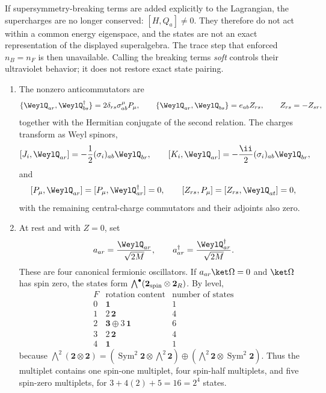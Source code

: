 \begin{enumerate}
\begin{enumerate}
      If supersymmetry-breaking terms are added explicitly to the
      Lagrangian, the supercharges are no longer conserved:
      \([H,Q_a]\ne0\).  They therefore do not act within a common
      energy eigenspace, and the states are not an exact representation
      of the displayed superalgebra.  The trace step that enforced
      \(n_B=n_F\) is then unavailable.  Calling the breaking terms
      \emph{soft} controls their ultraviolet behavior; it does not
      restore exact state pairing.
  \end{enumerate}

  \begin{enumerate}
    \item The nonzero anticommutators are
      \[
        \{\WeylQ_{ar},\WeylQ_{bs}^\dagger\}
          =2\delta_{rs}\sigma^\mu_{ab}P_\mu,
        \qquad
        \{\WeylQ_{ar},\WeylQ_{bs}\}=e_{ab}Z_{rs},
        \qquad Z_{rs}=-Z_{sr},
      \]
      together with the Hermitian conjugate of the second relation.  The
      charges transform as Weyl spinors,
      \[
        [J_i,\WeylQ_{ar}]
          =-\frac12(\sigma_i)_{ab}\WeylQ_{br},
        \qquad
        [K_i,\WeylQ_{ar}]
          =-\frac{\ii}{2}(\sigma_i)_{ab}\WeylQ_{br},
      \]
      and
      \[
        [P_\mu,\WeylQ_{ar}]=[P_\mu,\WeylQ_{ar}^\dagger]=0,
        \qquad [Z_{rs},P_\mu]=[Z_{rs},\WeylQ_{at}]=0,
      \]
      with the remaining central-charge commutators and their adjoints also
      zero.

    \item At rest and with \(Z=0\), set
      \[
        a_{ar}=\frac{\WeylQ_{ar}}{\sqrt{2M}},
        \qquad
        a_{ar}^\dagger=\frac{\WeylQ_{ar}^\dagger}{\sqrt{2M}}.
      \]
      These are four canonical fermionic oscillators.  If
      \(a_{ar}\ket\Omega=0\) and \(\ket\Omega\) has spin zero, the states form
      \(\bigwedge^\bullet(\mathbf2_{\rm spin}\otimes\mathbf2_R)\).  By level,
      \[
      \begin{array}{c|c|c}
        F&\text{rotation content}&\text{number of states}\\ \hline
        0&\mathbf1&1\\
        1&2\,\mathbf2&4\\
        2&\mathbf3\oplus3\,\mathbf1&6\\
        3&2\,\mathbf2&4\\
        4&\mathbf1&1
      \end{array}
      \]
      because
      \(\bigwedge^2(\mathbf2\otimes\mathbf2)
       =(\operatorname{Sym}^2\mathbf2\otimes\bigwedge^2\mathbf2)
       \oplus(\bigwedge^2\mathbf2\otimes\operatorname{Sym}^2\mathbf2)\).
      Thus the multiplet contains one spin-one multiplet, four spin-half
      multiplets, and five spin-zero multiplets, for
      \(3+4(2)+5=16=2^4\) states.


\end{enumerate}
\end{enumerate}

